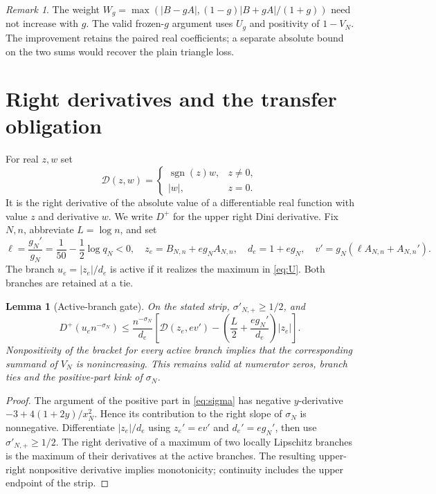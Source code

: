 \documentclass[11pt]{article}
\newtheorem{lemma}[theorem]{Lemma}
\theoremstyle{remark}
\newtheorem{remark}[theorem]{Remark}
\numberwithin{equation}{section}
\begin{document}
\begin{remark}
The weight $W_g=\max(|B-gA|,(1-g)|B+gA|/(1+g))$ need not increase with
$g$. The valid frozen-$g$ argument uses $U_g$ and positivity of $1-V_N$.
The improvement retains the paired real coefficients; a separate absolute
bound on the two sums would recover the plain triangle loss.
\end{remark}

\section{Right derivatives and the transfer obligation}\label{sec:dini}

For real $z,w$ set
\[
 \mathcal D(z,w)=
 \begin{cases}\operatorname{sgn}(z)w,&z\ne0,\\|w|,&z=0.\end{cases}
\]
It is the right derivative of the absolute value of a differentiable real
function with value $z$ and derivative $w$. We write $D^+$ for the upper
right Dini derivative. Fix $N,n$, abbreviate $L=\log n$, and set
\begin{equation}\label{eq:ell}
 \ell=\frac{g_N'}{g_N}=\frac1{50}-\frac12\log q_N<0,
 \quad z_e=B_{N,n}+eg_N A_{N,n},\quad d_e=1+eg_N,\quad
 v'=g_N(\ell A_{N,n}+A_{N,n}').
\end{equation}
The branch $u_e=|z_e|/d_e$ is active if it realizes the maximum in
\eqref{eq:U}. Both branches are retained at a tie.

\begin{lemma}[Active-branch gate]\label{lem:gate}
On the stated strip, $\sigma'_{N,+}\ge1/2$, and
\begin{equation}\label{eq:gate}
 D^+(u_e n^{-\sigma_N})\le
 \frac{n^{-\sigma_N}}{d_e}
 \left[\mathcal D(z_e,ev')-
 \left(\frac L2+\frac{eg_N'}{d_e}\right)|z_e|\right].
\end{equation}
Nonpositivity of the bracket for every active branch implies that the
corresponding summand of $V_N$ is nonincreasing. This remains valid at
numerator zeros, branch ties and the positive-part kink of $\sigma_N$.
\end{lemma}
\begin{proof}
The argument of the positive part in \eqref{eq:sigma} has negative
$y$-derivative $-3+4(1+2y)/x_N^2$. Hence its contribution to the
right slope of $\sigma_N$ is nonnegative. Differentiate $|z_e|/d_e$
using $z_e'=ev'$ and $d_e'=eg_N'$, then use $\sigma'_{N,+}\ge1/2$.
The right derivative of a maximum of two locally Lipschitz branches is
the maximum of their derivatives at the active branches. The resulting
upper-right nonpositive derivative implies monotonicity; continuity
includes the upper endpoint of the strip.
\end{proof}
\end{document}
